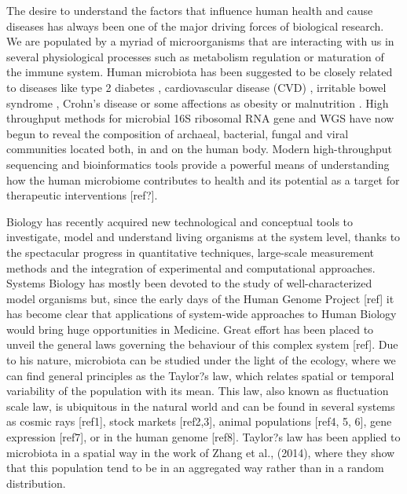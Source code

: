 The desire to understand the factors that influence human health and cause diseases has always been one of the major driving forces of biological research. We are populated by a myriad of microorganisms that are interacting with us in several physiological processes such as metabolism regulation or maturation of the immune system. Human microbiota has been suggested to be closely related to diseases like type 2 diabetes 
\cite{diabetes2}, cardiovascular disease (CVD) \cite{CVD}, irritable bowel syndrome \cite{IBS}, Crohn's disease \cite{CD} or some affections as obesity \cite{ob1, ob2} or malnutrition \cite{nutr}. High throughput methods for microbial 16S ribosomal RNA gene and WGS have now begun to reveal the composition of archaeal, bacterial, fungal and viral communities located both, in and on the human body. Modern high-throughput sequencing and bioinformatics tools provide a powerful means of understanding how the human microbiome contributes to health and its potential as a target for therapeutic interventions [ref?]. 

Biology has recently acquired new technological and conceptual tools to investigate, model and understand living organisms at the system level, thanks to the spectacular progress in quantitative techniques, large-scale measurement methods and the integration of experimental and computational approaches. Systems Biology has mostly been devoted to the study of well-characterized model organisms but, since the early days of the Human Genome Project [ref] it has become clear that applications of system-wide approaches to Human Biology would bring huge opportunities in Medicine. Great effort has been placed to unveil the general laws governing the behaviour of this complex system [ref]. Due to his nature, microbiota can be studied under the light of the ecology, where we can find general principles as the Taylor?s law, which relates spatial or temporal variability of the population with its mean. This law, also known as fluctuation scale law, is ubiquitous in the natural world and can be found in several systems as cosmic rays [ref1], stock markets [ref2,3], animal populations [ref4, 5, 6], gene expression [ref7], or in the human genome [ref8]. Taylor?s law has been applied to microbiota in a spatial way in the work of Zhang et al., (2014), where they show that this population tend to be in an aggregated way rather than in a random distribution. 

